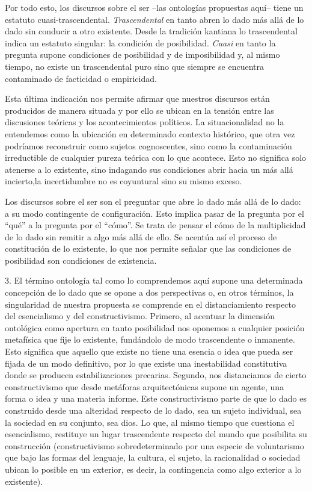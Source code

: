 \documentclass{book}
\begin{document}
Por todo esto, los discursos sobre el ser --las ontologías propuestas
aquí-- tiene un estatuto cuasi-trascendental. \emph{Trascendental} en
tanto abren lo dado más allá de lo dado sin conducir a otro existente.
Desde la tradición kantiana lo trascendental indica un estatuto
singular: la condición de posibilidad. \emph{Cuasi} en tanto la pregunta
supone condiciones de posibilidad y de imposibilidad y, al mismo tiempo,
no existe un trascendental puro sino que siempre se encuentra
contaminado de facticidad o empiricidad.

Esta última indicación nos permite afirmar que nuestros discursos están
producidos de manera situada y por ello se ubican en la tensión entre
las discusiones teóricas y los acontecimientos políticos. La
situacionalidad no la entendemos como la ubicación en determinado
contexto histórico, que otra vez podríamos reconstruir como sujetos
cognoscentes, sino como la contaminación irreductible de cualquier
pureza teórica con lo que acontece. Esto no significa solo atenerse a lo
existente, sino indagando sus condiciones abrir hacia un más allá
incierto,la incertidumbre no es coyuntural sino su mismo exceso.

Los discursos sobre el ser son el preguntar que abre lo dado más allá de
lo dado: a su modo contingente de configuración. Esto implica pasar de
la pregunta por el \enquote{qué} a la pregunta por el \enquote{cómo}. Se trata de pensar
el cómo de la multiplicidad de lo dado sin remitir a algo más allá de
ello. Se acentúa así el proceso de constitución de lo existente, lo que
nos permite señalar que las condiciones de posibilidad son condiciones
de existencia.

3. El término ontología tal como lo comprendemos aquí supone una
determinada concepción de lo dado que se opone a dos perspectivas o, en
otros términos, la singularidad de nuestra propuesta se comprende en el
distanciamiento respecto del esencialismo y del constructivismo.
Primero, al acentuar la dimensión ontológica como apertura en tanto
posibilidad nos oponemos a cualquier posición metafísica que fije lo
existente, fundándolo de modo trascendente o inmanente. Esto significa
que aquello que existe no tiene una esencia o idea que pueda ser fijada
de un modo definitivo, por lo que existe una inestabilidad constitutiva
donde se producen estabilizaciones precarias. Segundo, nos distanciamos
de cierto constructivismo que desde metáforas arquitectónicas supone un
agente, una forma o idea y una materia informe. Este constructivismo
parte de que lo dado es construido desde una alteridad respecto de lo
dado, sea un sujeto individual, sea la sociedad en su conjunto, sea
dios. Lo que, al mismo tiempo que cuestiona el esencialismo, restituye
un lugar trascendente respecto del mundo que posibilita su construcción
(constructivismo sobredeterminado por una especie de voluntarismo que
bajo las formas del lenguaje, la cultura, el sujeto, la racionalidad o
 sociedad ubican lo posible en un exterior, es decir, la contingencia
como algo exterior a lo existente).
\end{document}
